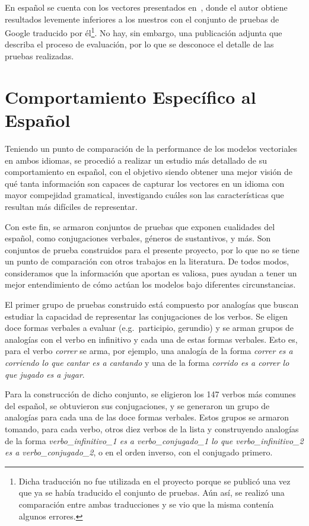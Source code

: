 En español se cuenta con los vectores presentados en~\cite{SBWCE}, donde el autor obtiene resultados
levemente inferiores a los nuestros con el conjunto de pruebas de Google traducido por
él\footnote{Dicha traducción no fue utilizada en el proyecto porque se publicó una vez que ya se
había traducido el conjunto de pruebas. Aún así, se realizó una comparación entre ambas traducciones
y se vio que la misma contenía algunos errores.}. No hay, sin embargo, una publicación adjunta que
describa el proceso de evaluación, por lo que se desconoce el detalle de las pruebas realizadas.


\section{Comportamiento Específico al Español}

Teniendo un punto de comparación de la performance de los modelos vectoriales en ambos idiomas, se
procedió a realizar un estudio más detallado de su comportamiento en español, con el objetivo siendo
obtener una mejor visión de qué tanta información son capaces de capturar los vectores en un idioma
con mayor compejidad gramatical, investigando cuáles son las características que resultan más
difíciles de representar.

Con este fin, se armaron conjuntos de pruebas que exponen cualidades del español, como conjugaciones
verbales, géneros de sustantivos, y más. Son conjuntos de prueba construidos para el presente
proyecto, por lo que no se tiene un punto de comparación con otros trabajos en la literatura. De
todos modos, consideramos que la información que aportan es valiosa, pues ayudan a tener un mejor
entendimiento de cómo actúan los modelos bajo diferentes circunstancias.


El primer grupo de pruebas construido está compuesto por analogías que buscan estudiar la capacidad
de representar las conjugaciones de los verbos. Se eligen doce formas verbales a evaluar
(e.g.\ participio, gerundio) y se arman grupos de analogías con el verbo en infinitivo y cada una de
estas formas verbales. Esto es, para el verbo \textit{correr} se arma, por ejemplo, una analogía de
la forma \textit{correr es a corriendo lo que cantar es a cantando} y una de la forma
\textit{corrido es a correr lo que jugado es a jugar}.

Para la construcción de dicho conjunto, se eligieron los 147 verbos más comunes del español, se
obtuvieron sus conjugaciones, y se generaron un grupo de analogías para cada una de las doce formas
verbales. Estos grupos se armaron tomando, para cada verbo, otros diez verbos de la lista y
construyendo analogías de la forma \textit{verbo\_infinitivo\_1 es a verbo\_conjugado\_1 lo que
verbo\_infinitivo\_2 es a verbo\_conjugado\_2}, o en el orden inverso, con el conjugado primero.

